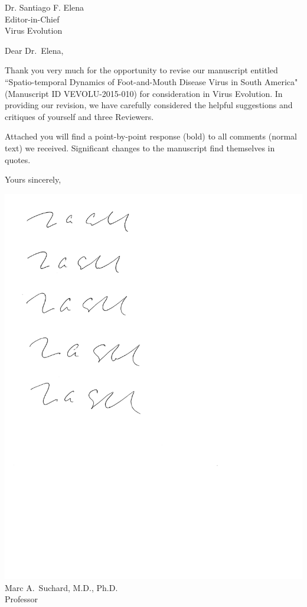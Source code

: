 \documentclass[ucla,biomath,12pt,noaddrfooter,datefrom]{UC_letter}
\begin{document}
 



\begin{letter}{
Dr. Santiago F. Elena \\
Editor-in-Chief \\
Virus Evolution
}

\opening{Dear Dr.~Elena,}

Thank you very much for the opportunity to revise our manuscript entitled ``Spatio-temporal Dynamics of Foot-and-Mouth Disease Virus in South America" (Manuscript ID VEVOLU-2015-010) for consideration in Virus Evolution. In providing our revision, we have carefully considered the helpful suggestions and critiques of yourself and three Reviewers.

Attached you will find a point-by-point response (bold) to all comments (normal text) we received. Significant changes to the manuscript find themselves in quotes.

Yours sincerely, \\
\par
\vspace*{-0.2in}
\includegraphics[scale=0.75]{Suchard_signature} \\
Marc A.~Suchard, M.D., Ph.D. \\
Professor


\end{letter}
\end{document}
